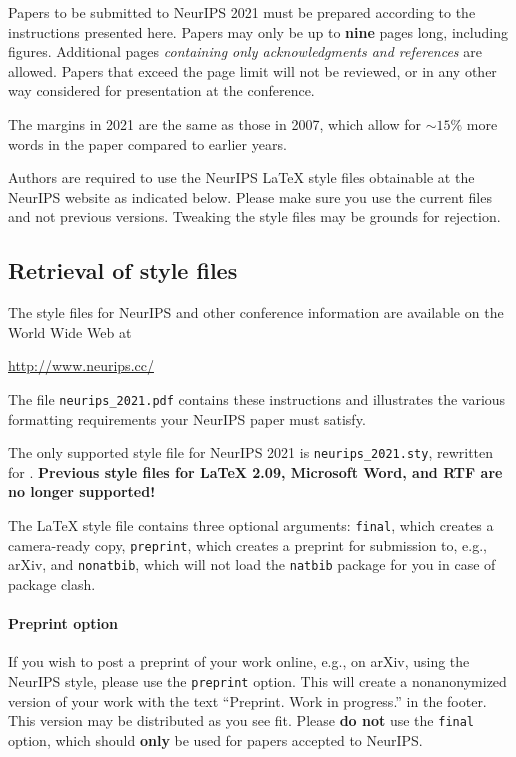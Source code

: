 \documentclass{article}
\begin{document}
	Papers to be submitted to NeurIPS 2021 must be prepared according to the
	instructions presented here. Papers may only be up to {\bf nine} pages long,
	including figures. Additional pages \emph{containing only acknowledgments and
		references} are allowed. Papers that exceed the page limit will not be
	reviewed, or in any other way considered for presentation at the conference.
	
	The margins in 2021 are the same as those in 2007, which allow for $\sim$$15\%$
	more words in the paper compared to earlier years.
	
	Authors are required to use the NeurIPS \LaTeX{} style files obtainable at the
	NeurIPS website as indicated below. Please make sure you use the current files
	and not previous versions. Tweaking the style files may be grounds for
	rejection.
	
	\subsection{Retrieval of style files}
	
	The style files for NeurIPS and other conference information are available on
	the World Wide Web at
	\begin{center}
		\url{http://www.neurips.cc/}
	\end{center}
	The file \verb+neurips_2021.pdf+ contains these instructions and illustrates the
	various formatting requirements your NeurIPS paper must satisfy.
	
	The only supported style file for NeurIPS 2021 is \verb+neurips_2021.sty+,
	rewritten for \LaTeXe{}.  \textbf{Previous style files for \LaTeX{} 2.09,
		Microsoft Word, and RTF are no longer supported!}
	
	The \LaTeX{} style file contains three optional arguments: \verb+final+, which
	creates a camera-ready copy, \verb+preprint+, which creates a preprint for
	submission to, e.g., arXiv, and \verb+nonatbib+, which will not load the
	\verb+natbib+ package for you in case of package clash.
	
	\paragraph{Preprint option}
	If you wish to post a preprint of your work online, e.g., on arXiv, using the
	NeurIPS style, please use the \verb+preprint+ option. This will create a
	nonanonymized version of your work with the text ``Preprint. Work in progress.''
	in the footer. This version may be distributed as you see fit. Please \textbf{do
		not} use the \verb+final+ option, which should \textbf{only} be used for
	papers accepted to NeurIPS.
	
\end{document}
